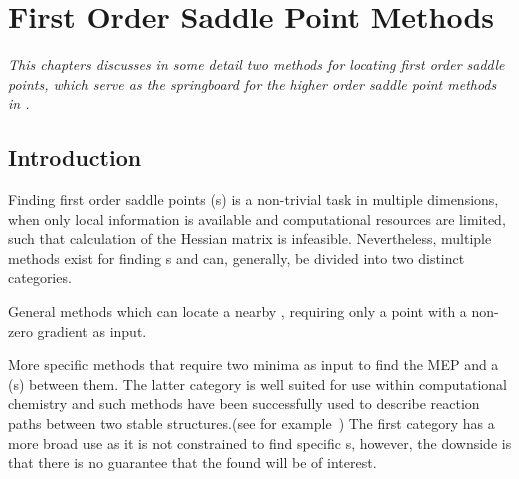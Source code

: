 \chapter{First Order Saddle Point Methods}
\label{chap:saddle-point-methods}
\textit{This chapters discusses in some detail two methods for locating first order saddle points, which serve as the springboard for the higher order saddle point methods in .}
\section{Introduction}
Finding first order saddle points (s) is a non-trivial task in multiple dimensions, when only local information is available and computational resources are limited, such that calculation of the Hessian matrix is infeasible.
Nevertheless, multiple methods exist for finding s and can, generally, be divided into two distinct categories.
\item General methods which can locate a nearby , requiring only a point with a non-zero gradient as input.
\item More specific methods that require two minima as input to find the MEP and a  (s) between them.
\een
The latter category is well suited for use within computational chemistry and such methods have been successfully used to describe reaction paths between two stable structures.(see for example~\cite{double-defect-2011})
The first category has a more broad use as it is not constrained to find specific s, however, the downside is that there is no guarantee that the found  will be of interest.





